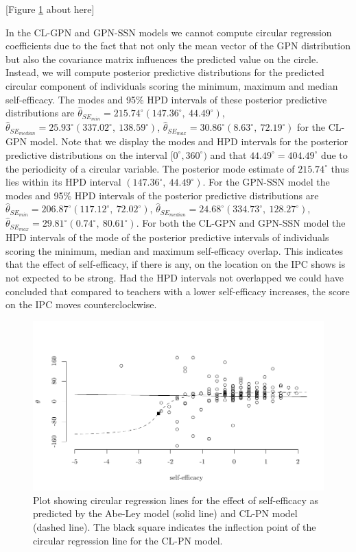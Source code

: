 \documentclass[man,mask]{apa6}
\begin{document}
\hfil \hspace{2cm} {[}Figure \ref{regline} about here{]} \hfil

\indent In the CL-GPN and GPN-SSN models we cannot compute circular regression
coefficients due to the fact that not only the mean vector of the GPN
distribution but also the covariance matrix influences the predicted value on
the circle. Instead, we will compute posterior predictive distributions for the
predicted circular component of individuals scoring the minimum, maximum and
median self-efficacy. The modes and 95\% HPD intervals of these posterior
predictive distributions are \(\hat{\theta}_{SE_{min}} = 215.74^\circ (147.36^\circ, \: 44.49^\circ)\), \(\hat{\theta}_{SE_{median}} = 25.93^\circ (337.02^\circ, \: 138.59^\circ)\), \(\hat{\theta}_{SE_{max}} = 30.86^\circ (8.63^\circ, \: 72.19^\circ)\) for the CL-GPN model. Note that we display the
modes and HPD intervals for the posterior predictive distributions on the
interval \([0^\circ, 360^\circ)\) and that \(44.49^\circ = 404.49^\circ\) due to the
periodicity of a circular variable. The posterior mode estimate of
\(215.74^\circ\) thus lies within its HPD interval \((147.36^\circ, \: 44.49^\circ)\). For the GPN-SSN model the modes and 95\% HPD intervals of the
posterior predictive distributions are \(\hat{\theta}_{SE_{min}} = 206.87^\circ (117.12^\circ, \: 72.02^\circ)\), \(\hat{\theta}_{SE_{median}} = 24.68^\circ (334.73^\circ, \: 128.27^\circ)\), \(\hat{\theta}_{SE_{max}} = 29.81^\circ (0.74^\circ, \: 80.61^\circ)\). For both the CL-GPN and GPN-SSN model the HPD
intervals of the mode of the posterior predictive intervals of individuals
scoring the minimum, median and maximum self-efficacy overlap. This indicates
that the effect of self-efficacy, if there is any, on the location on the IPC shows is not expected to be strong. Had the HPD intervals not
overlapped we could have concluded that compared to teachers with a lower self-efficacy increases, the
score on the IPC moves counterclockwise.

\begin{figure}
\centering
\includegraphics[width = \textwidth]{Plots/reglinediffSE.pdf}
\caption{Plot showing circular regression lines for the effect of self-efficacy
as predicted by the Abe-Ley model (solid line) and CL-PN model (dashed line). The
black square indicates the inflection point of the circular regression line for
the CL-PN model.}
\label{regline}
\end{figure}
\end{document}
